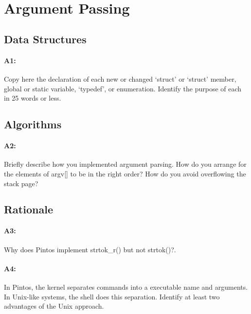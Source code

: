 \section{Argument Passing}
\subsection{Data Structures}
\paragraph{A1:} %
Copy here the declaration of each new or changed `struct' or `struct' member, global or static variable, `typedef', or enumeration.  Identify the purpose of each in 25 words or less.

\subsection{Algorithms}
\paragraph{A2:} %
Briefly describe how you implemented argument parsing.  How do you arrange for the elements of argv[] to be in the right order? How do you avoid overflowing the stack page?

\subsection{Rationale}
\paragraph{A3:} %
Why does Pintos implement strtok\_r() but not strtok()?.

\paragraph{A4:} %
In Pintos, the kernel separates commands into a executable name and arguments.  In Unix-like systems, the shell does this separation.  Identify at least two advantages of the Unix approach.
